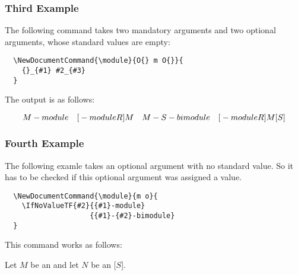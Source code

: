 \documentclass[a4paper, 10pt, abstract=on, headings=standardclasses]{scrartcl}
\begin{document}
\subsubsection{Third Example}

The following command takes two mandatory arguments and two optional arguments, whose standard values are empty:
\begin{lstlisting}
  \NewDocumentCommand{\module}{O{} m O{}}{
    {}_{#1} #2_{#3}
  }
\end{lstlisting}
The output is as follows:
\begin{LTXexample}[pos = r]
  \[
    \module{M}
    \quad
    \module[R]{M}
    \quad
    \module{M}[S]
    \quad
    \module[R]{M}[S]
  \]
\end{LTXexample}

\subsubsection{Fourth Example}

The following examle takes an optional argument with no standard value.
So it has to be checked if this optional argument was assigned a value.
\begin{lstlisting}
  \NewDocumentCommand{\module}{m o}{
    \IfNoValueTF{#2}{{#1}-module}
                    {{#1}-{#2}-bimodule}
  }
\end{lstlisting}
This command works as follows:
\begin{LTXexample}[pos = b]
  Let $M$ be an  and let $N$ be an [$S$].
\end{LTXexample}





% 
% 
% 
% 
% 
\end{document}
